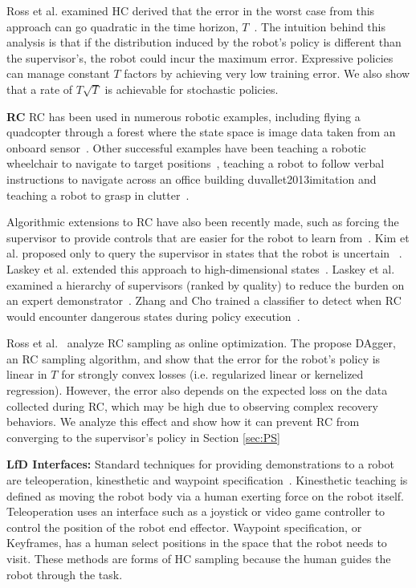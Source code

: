 \documentclass[10pt, conference]{ieeeconf}      %
\newcommand{\ns}{HC }
\newcommand{\nc}{RC }
\begin{document}
Ross et al. examined \ns  derived that the error in the worst case from this approach can go quadratic in the time horizon, $T$~\cite{ross2010efficient}. The intuition behind this analysis is that if the distribution induced by the robot's policy is different than the supervisor's, the robot could incur the maximum error. Expressive policies can manage constant $T$ factors by achieving very low training error. We also show that a rate of $T\sqrt{T}$ is achievable for stochastic policies. 

\noindent \textbf{\nc}
\nc has been used in numerous robotic examples, including flying a quadcopter through a forest where the state space is image data taken from an onboard sensor~\cite{ross2013learning}. Other successful examples have been teaching a robotic wheelchair to navigate to target positions~\cite{kim2013maximum}, teaching a robot to follow verbal instructions to navigate across an office building {duvallet2013imitation} and teaching a robot to grasp in clutter~\cite{laskeyrobot}.

Algorithmic extensions to \nc have also been recently made, such as forcing the supervisor to provide controls that are easier for the robot to learn from~\cite{he2012imitation}.  Kim et al. proposed only to query the supervisor in states that the robot is uncertain~\cite{kim2013maximum} . Laskey et al. extended this approach to high-dimensional states~\cite{laskeyshiv}. Laskey et al. examined a hierarchy of supervisors (ranked by quality)  to reduce the burden on an expert demonstrator~\cite{laskeyrobot}. Zhang and Cho trained a classifier to detect when \nc would encounter dangerous states during policy execution~\cite{zhang2016query}.

Ross et al.~\cite{ross2010reduction} analyze RC sampling as online optimization. The propose DAgger, an RC sampling algorithm, and show that the error for the robot's policy is linear in $T$ for strongly convex losses (i.e.  regularized linear or kernelized regression). 
However, the error also depends on the expected loss on the data collected during RC, which may be high due to observing complex recovery behaviors. We analyze this effect and show how it can prevent RC from converging to the supervisor's policy in Section \ref{sec:PS}

\textbf{LfD Interfaces:}
Standard techniques for providing demonstrations to a robot are teleoperation, kinesthetic and waypoint specification~\cite{akgun2012keyframe,akgun2012novel,argall2009survey}. Kinesthetic teaching is defined as moving the robot body via a human exerting force on the robot itself. Teleoperation uses an interface such as a joystick or video game controller to control the position of the robot end effector. Waypoint specification, or Keyframes, has a human select positions in the space that the robot needs to visit. These methods are forms of HC sampling because the human guides the robot through the task. 
\end{document}
